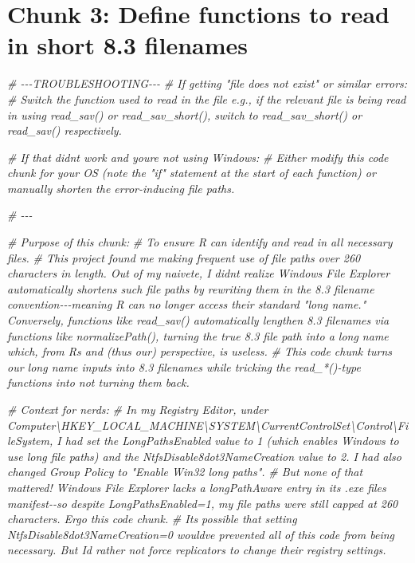 \documentclass[
]{article}
\newenvironment{Shaded}{\begin{snugshade}}{\end{snugshade}}
\newcommand{\CommentTok}[1]{\textcolor[rgb]{0.56,0.35,0.01}{\textit{#1}}}
\newcounter{none} %
\begin{document}
\section*{Chunk 3: Define functions to read in short 8.3 filenames}\label{chunk-3-define-functions-to-read-in-short-8.3-filenames}

\begin{Shaded}
\begin{Highlighting}[]
\CommentTok{\# {-}{-}{-}TROUBLESHOOTING{-}{-}{-}}
\CommentTok{\# If getting "file does not exist" or similar errors:}
\CommentTok{\# Switch the function used to read in the file e.g., if the relevant file is being read in using read\_sav() or read\_sav\_short(), switch to read\_sav\_short() or read\_sav() respectively.}

\CommentTok{\# If that didn\textquotesingle{}t work and you\textquotesingle{}re not using Windows: }
\CommentTok{\# Either modify this code chunk for your OS (note the "if" statement at the start of each function) or manually shorten the error{-}inducing file paths.}

\CommentTok{\# {-}{-}{-}}

\CommentTok{\# Purpose of this chunk: }
\CommentTok{\# To ensure R can identify and read in all necessary files.}
\CommentTok{\# This project found me making frequent use of file paths over 260 characters in length. Out of my naivete, I didn\textquotesingle{}t realize Windows File Explorer automatically shortens such file paths by rewriting them in the 8.3 filename convention{-}{-}{-}meaning R can no longer access their standard "long name." Conversely, functions like read\_sav() automatically lengthen 8.3 filenames via functions like normalizePath(), turning the true 8.3 file path into a long name which, from R\textquotesingle{}s and (thus our) perspective, is useless.}
\CommentTok{\# This code chunk turns our long name inputs into 8.3 filenames while tricking the read\_*(){-}type functions into not turning them back.}


\CommentTok{\# Context for nerds:}
\CommentTok{\# In my Registry Editor, under Computer\textbackslash{}HKEY\_LOCAL\_MACHINE\textbackslash{}SYSTEM\textbackslash{}CurrentControlSet\textbackslash{}Control\textbackslash{}FileSystem, I had set the LongPathsEnabled value to 1 (which enables Windows to use long file paths) and the NtfsDisable8dot3NameCreation value to 2. I had also changed Group Policy to "Enable Win32 long paths".}
\CommentTok{\# But none of that mattered! Windows File Explorer lacks a longPathAware entry in its .exe file\textquotesingle{}s manifest{-}{-}so despite LongPathsEnabled=1, my file paths were still capped at 260 characters. Ergo this code chunk.}
\CommentTok{\# It\textquotesingle{}s possible that setting NtfsDisable8dot3NameCreation=0 would\textquotesingle{}ve prevented all of this code from being necessary. But I\textquotesingle{}d rather not force replicators to change their registry settings.}


\end{Highlighting}
\end{Shaded}
\end{document}
